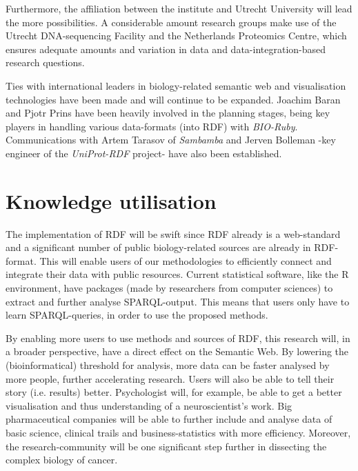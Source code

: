 \documentclass[twoside,fontsize=10pt]{article}
\begin{document}
Furthermore, the affiliation between the institute and Utrecht University will lead the more possibilities. A considerable amount research groups make use of the Utrecht DNA-sequencing Facility and the Netherlands Proteomics Centre, which ensures adequate amounts and variation in data and data-integration-based research questions. 

Ties with international leaders in biology-related semantic web and visualisation technologies have been made and will continue to be expanded. Joachim Baran and Pjotr Prins have been heavily involved in the planning stages, being key players in handling various data-formats (into RDF) with \textit{BIO-Ruby}. Communications with Artem Tarasov of \textit{Sambamba} and Jerven Bolleman -key engineer of the \textit{UniProt-RDF} project- have also been established.
\section*{Knowledge utilisation}
The implementation of RDF will be swift since RDF already is a web-standard and a significant number of public biology-related sources are already in RDF-format. This will enable users of our methodologies to efficiently connect and integrate their data with public resources. Current statistical software, like the R environment, have packages (made by researchers from computer sciences) to extract and further analyse SPARQL-output. This means that users only have to learn SPARQL-queries, in order to use the proposed methods.

By enabling more users to use methods and sources of RDF, this research will, in a broader perspective, have a direct effect on the Semantic Web. By lowering the (bioinformatical) threshold for analysis, more data can be faster analysed by more people, further accelerating research. Users will also be able to tell their story (i.e. results) better. Psychologist will, for example, be able to get a better visualisation and thus understanding of a neuroscientist's work. Big pharmaceutical companies will be able to further include and analyse data of basic science, clinical trails and business-statistics with more efficiency. Moreover, the research-community will be one significant step further in dissecting the complex biology of cancer.


%
%
%
\end{document}
